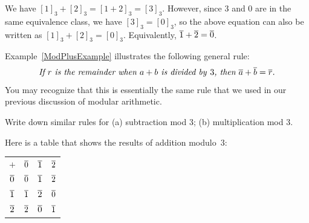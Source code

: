 \begin{eg}\label{ModPlusExample}
We have $[1]_3 + [2]_3 = [1 + 2]_3 = [3]_3$. However, since 3 and 0 are in the same equivalence class, we have $[3]_3 = [0]_3$, so the above equation can also be written as $[1]_3 + [2]_3 = [0]_3$. Equivalently, $\overline{1} + \overline{2} = \overline{0}$.
\end{eg}

Example~\ref{ModPlusExample} illustrates the following general rule:
$$ \text{%
\it If $r$ is the remainder when $a + b$ is divided by\/~$3$, then $\class{a} + \class{b} = \class{r}$.} $$
You may recognize that this is essentially the same rule that we used in our previous discussion of modular arithmetic.

\begin{exercise}\label{exercise:EquivalenceRelationsChap:47}
Write down similar rules for (a) subtraction mod 3; (b) multiplication mod 3.
\end{exercise}

\begin{eg}
Here is a table that shows the results of addition modulo~$3$:
\begin{center} \begin{tabular}{c||c|c|c}
$+$&$\overline{0}$&$\overline{1}$&$\overline{2}$ \\
\noalign{\hrule}
\noalign{\smallskip}
\noalign{\hrule}
$\overline{0}$&$\overline{0}$&$\overline{1}$&$\overline{2}$ \\
\noalign{\hrule}
$\overline{1}$&$\overline{1}$&$\overline{2}$&$\overline{0}$ \\
\noalign{\hrule}
$\overline{2}$&$\overline{2}$&$\overline{0}$&$\overline{1}$ \\
\end{tabular}
\end{center}
\end{eg}


